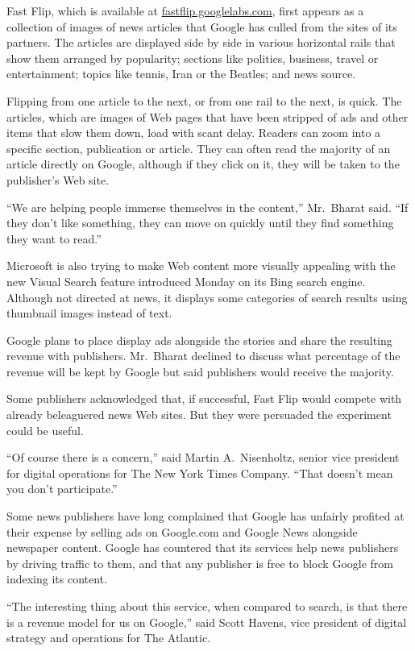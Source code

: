 ﻿\documentclass[12pt]{article}
\begin{document}
Fast Flip, which is available at \href{http://fastflip.googlelabs.com}{fastflip.googlelabs.com},
first appears as a collection of images of news articles that Google has culled from the sites of
its partners. The articles are displayed side by side in various horizontal rails that show them
arranged by popularity; sections like politics, business, travel or entertainment; topics like
tennis, Iran or the Beatles; and news source.

Flipping from one article to the next, or from one rail to the next, is quick. The articles, which
are images of Web pages that have been stripped of ads and other items that slow them down, load
with scant delay. Readers can zoom into a specific section, publication or article. They can often
read the majority of an article directly on Google, although if they click on it, they will be taken
to the publisher's Web site.

``We are helping people immerse themselves in the content,'' Mr.~Bharat said. ``If they don't like
something, they can move on quickly until they find something they want to read.''

Microsoft is also trying to make Web content more visually appealing with the new Visual Search
feature introduced Monday on its Bing search engine. Although not directed at news, it displays some
categories of search results using thumbnail images instead of text.

Google plans to place display ads alongside the stories and share the resulting revenue with
publishers. Mr.~Bharat declined to discuss what percentage of the revenue will be kept by Google but
said publishers would receive the majority.

Some publishers acknowledged that, if successful, Fast Flip would compete with already beleaguered
news Web sites. But they were persuaded the experiment could be useful.

``Of course there is a concern,'' said Martin A.~Nisenholtz, senior vice president for digital
operations for The New York Times Company. ``That doesn't mean you don't participate.''

Some news publishers have long complained that Google has unfairly profited at their expense by
selling ads on Google.com and Google News alongside newspaper content. Google has countered that its
services help news publishers by driving traffic to them, and that any publisher is free to block
Google from indexing its content.

``The interesting thing about this service, when compared to search, is that there is a revenue
model for us on Google,'' said Scott Havens, vice president of digital strategy and operations for
The Atlantic.
\end{document}
